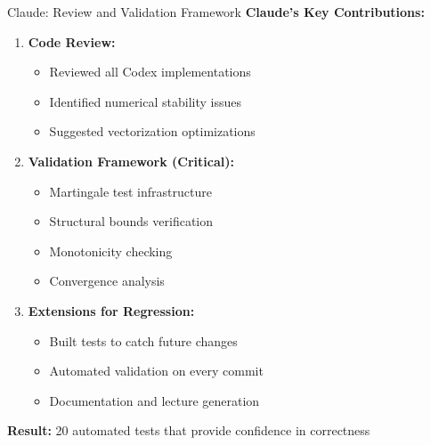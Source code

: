 \documentclass[aspectratio=169,11pt]{beamer}
\begin{document}
\begin{frame}{Claude: Review and Validation Framework}
\textbf{Claude's Key Contributions:}

\begin{enumerate}
    \item \textbf{Code Review:}
    \begin{itemize}
        \item Reviewed all Codex implementations
        \item Identified numerical stability issues
        \item Suggested vectorization optimizations
    \end{itemize}

    \item \textbf{Validation Framework (Critical):}
    \begin{itemize}
        \item Martingale test infrastructure
        \item Structural bounds verification
        \item Monotonicity checking
        \item Convergence analysis
    \end{itemize}

    \item \textbf{Extensions for Regression:}
    \begin{itemize}
        \item Built tests to catch future changes
        \item Automated validation on every commit
        \item Documentation and lecture generation
    \end{itemize}
\end{enumerate}

\textbf{Result:} 20 automated tests that provide confidence in correctness
\end{frame}
\end{document}
